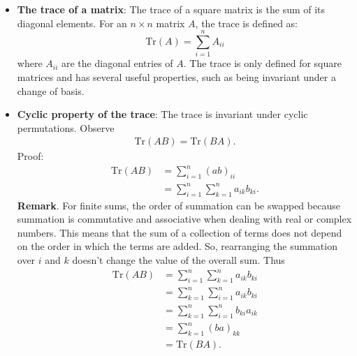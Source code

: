 \documentclass{report}
\begin{document}
    \pagebreak 
    \begin{itemize}
                \item \textbf{The trace of a matrix}: The trace of a square matrix is the sum of its diagonal elements. For an 
            $n \times n$ matrix $A$, the trace is defined as:
            \[
                \text{Tr}(A) = \sum_{i=1}^{n} A_{ii}
            \]
            where $A_{ii}$ are the diagonal entries of $A$. The trace is only defined for square matrices and has several useful properties, such as being invariant under a change of basis.
        \item \textbf{Cyclic property of the trace}: The trace is invariant under cyclic permutations. Observe
            \begin{align*}
                \text{Tr}(AB) = \text{Tr}(BA)
            .\end{align*}
            \bigbreak \noindent 
            Proof:
            \begin{align*}
                \text{Tr}(AB) &= \sum_{i=1}^{n}(ab)_{ii}  \\
                &=\sum_{i=1}^{n}\sum_{k=1}^{n}a_{ik}b_{ki}
            .\end{align*}
            \bigbreak \noindent 
            \textbf{Remark}. For finite sums, the order of summation can be swapped because summation is commutative and associative when dealing with real or complex numbers. This means that the sum of a collection of terms does not depend on the order in which the terms are added. So, rearranging the summation over $i$ and $k$ doesn't change the value of the overall sum. Thus
            \begin{align*}
                \text{Tr}(AB) &= \sum_{i=1}^{n}\sum_{k=1}^{n}a_{ik}b_{ki} \\
                              &= \sum_{k=1}^{n}\sum_{i=1}^{n}a_{ik}b_{ki} \\
                              &= \sum_{k=1}^{n}\sum_{i=1}^{n}b_{ki} a_{ik} \\
                              &= \sum_{k=1}^{n}(ba)_{kk} \\
                              &= \text{Tr}(BA)
            .\end{align*}

    \end{itemize}
\end{document}
